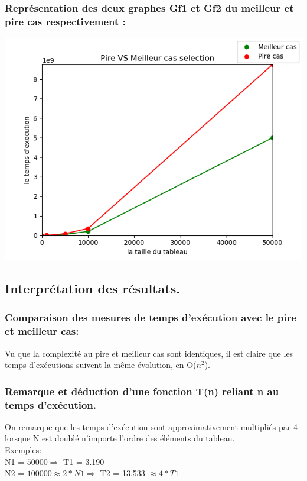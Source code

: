\documentclass[12pt]{article}
\begin{document}
\subsubsection{Représentation des deux graphes Gf1 et Gf2 du meilleur et pire cas respectivement :}

\includegraphics[width=1\textwidth]{graphe/Pire_Meilleur_Selection.png}


\subsection{Interprétation des résultats.}
\subsubsection{Comparaison des mesures de temps d'exécution avec le pire et meilleur cas:}
	  
Vu que la complexité au pire et meilleur cas sont identiques, il est claire que les temps d'exécutions suivent la même évolution, en O($n^2$).

\subsubsection{Remarque et déduction d'une fonction T(n) reliant n au temps d'exécution.}

On remarque que les temps d'exécution sont approximativement multipliés par 4 lorsque N est doublé n'importe l'ordre des éléments du tableau.
\\

\color{blue}
Exemples:
\color{black} 
\\
N1 = $50000  \Rightarrow  $  T1 = 3.190
\\
N2 = $100000 \approx 2 * N1  \Rightarrow  $  T2 = 13.533 $\approx 4 * T1 $
\\
\end{document}
